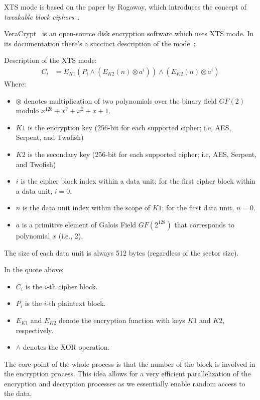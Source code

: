 XTS mode is based on the paper by Rogaway, which introduces the concept of \textit{tweakable block ciphers}~\cite{Rogaway}.

VeraCrypt~\cite{VeraCrypt} is an open-source disk encryption software which uses XTS mode.
In its documentation there's a succinct description of the mode~\cite{VeraCrypt-modes}:

\begin{fancyquote}
    Description of the XTS mode:
    \begin{align*}
        C_i &= E_{K1}(P_i \wedge (E_{K2}(n) \otimes a^i)) \wedge (E_{K2}(n) \otimes a^i)
    \end{align*}
    Where:
    \begin{itemize}
        \item $\otimes$ denotes multiplication of two polynomials over the binary field $GF(2)$ modulo $x^{128} + x^7 + x^2 + x + 1$.
        \item $K1$ is the encryption key (256-bit for each supported cipher; i.e, AES, Serpent, and Twofish)
        \item $K2$ is the secondary key (256-bit for each supported cipher; i.e, AES, Serpent, and Twofish)
        \item $i$ is the cipher block index within a data unit; for the first cipher block within a data unit, $i = 0$.
        \item $n$ is the data unit index within the scope of $K1$; for the first data unit, $n = 0$.
        \item $a$ is a primitive element of Galois Field $GF(2^{128})$ that corresponds to polynomial $x$ (i.e., 2).
    \end{itemize}
    The size of each data unit is always 512 bytes (regardless of the sector size).
\end{fancyquote}

In the quote above:
\begin{itemize}
    \item $C_i$ is the $i$-th cipher block.
    \item $P_i$ is the $i$-th plaintext block.
    \item $E_{K1}$ and $E_{K2}$ denote the encryption function with keys $K1$ and $K2$, respectively.
    \item $\wedge$ denotes the XOR operation.
\end{itemize}

The core point of the whole process is that the number of the block is involved in the encryption process.
This idea allows for a very efficient parallelization of the encryption and decryption processes as we essentially enable random access to the data.

